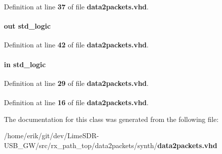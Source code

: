 Definition at line {\bf 37} of file {\bf data2packets.\+vhd}.

\paragraph[{pct\+\_\+wrreq}]{ {\bfseries \textcolor{keywordflow}{out}\textcolor{vhdlchar}{ }} {\bfseries \textcolor{comment}{std\+\_\+logic}\textcolor{vhdlchar}{ }} \hspace{0.3cm}{\ttfamily [Port]}}\label{classdata2packets_aa3bb3b6b81e0611997ec9208d470de50}


Definition at line {\bf 42} of file {\bf data2packets.\+vhd}.

\paragraph[{reset\+\_\+n}]{ {\bfseries \textcolor{keywordflow}{in}\textcolor{vhdlchar}{ }} {\bfseries \textcolor{comment}{std\+\_\+logic}\textcolor{vhdlchar}{ }} \hspace{0.3cm}{\ttfamily [Port]}}\label{classdata2packets_a446ea52ed8c4a84181a47d9165ce41a5}


Definition at line {\bf 29} of file {\bf data2packets.\+vhd}.

\paragraph[{std\+\_\+logic\+\_\+1164}]{\hspace{0.3cm}{\ttfamily [Package]}}\label{classdata2packets_acd03516902501cd1c7296a98e22c6fcb}


Definition at line {\bf 16} of file {\bf data2packets.\+vhd}.



The documentation for this class was generated from the following file\+:\begin{DoxyCompactItemize}
\item 
/home/erik/git/dev/\+Lime\+S\+D\+R-\/\+U\+S\+B\+\_\+\+G\+W/src/rx\+\_\+path\+\_\+top/data2packets/synth/{\bf data2packets.\+vhd}\end{DoxyCompactItemize}
